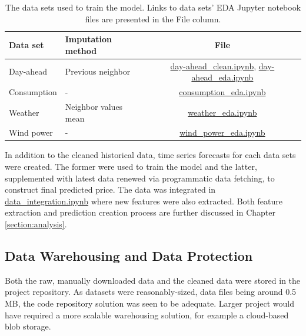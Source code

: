 \documentclass{article}
\begin{document}
\begin{table}[ht] 
\centering 
\begin{tabular}{l||l c} 
Data set & Imputation method & File\\ 
\hline \hline
Day-ahead & Previous neighbor & \href{https://github.com/IDS-mini/electricity/blob/main/data/day-ahead_clean.ipynb}{day-ahead\_clean.ipynb},  \href{https://github.com/IDS-mini/electricity/blob/main/data/day-ahead_eda.ipynb}{day-ahead\_eda.ipynb}\\
Consumption & - & \href{https://github.com/IDS-mini/electricity/blob/main/data/consumption_eda.ipynb}{consumption\_eda.ipynb} \\
Weather & Neighbor values mean & \href{https://github.com/IDS-mini/electricity/blob/main/data/weather_eda.ipynb}{weather\_eda.ipynb} \\
Wind power & - & \href{https://github.com/IDS-mini/electricity/blob/main/data/wind_power_eda.ipynb}{wind\_power\_eda.ipynb}\\
\hline
\end{tabular}
\caption{The data sets used to train the model. Links to data sets' EDA Jupyter notebook files are presented in the File column.}
\label{table:eda}
\end{table}

In addition to the cleaned historical data, time series forecasts for each data sets were created. The former were used to train the model and the latter, supplemented with latest data renewed via programmatic data fetching, to construct final predicted price. The data was integrated in \href{https://github.com/IDS-mini/electricity/blob/main/data/data_integration.ipynb}{data\_integration.ipynb} where new features were also extracted. Both feature extraction and prediction creation process are further discussed in Chapter \ref{section:analysis}.



\subsection{Data Warehousing and Data Protection}
\label{subsection:warehousing}

Both the raw, manually downloaded data and the cleaned data were stored in the project repository. As datasets were reasonably-sized, data files being around 0.5 MB, the code repository solution was seen to be adequate. Larger project would have required a more scalable warehousing solution, for example a cloud-based blob storage.
\end{document}
